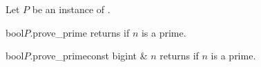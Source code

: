 \HIGH

Let $P$ be an instance of .
\begin{cfcode}{bool}{$P$.prove_prime}{}
        returns  if $n$ is a prime.
\end{cfcode}
\begin{cfcode}{bool}{$P$.prove_prime}{const bigint & $n$}
        returns  if $n$ is a prime.
\end{cfcode}
